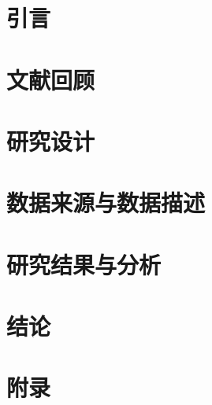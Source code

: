 \documentclass[lang=cn,a4paper]{elegantpaper}
\author{Zhengqing ZHOU \\ Peking University \and Zhengqing ZHOU \\ PA Technology}
\institute{\href{https://pe.pku.edu.cn/}{体育教研部}}
\date{\zhtoday}
\begin{document}
\begin{titlepage}
\clearpage\maketitle
\thispagestyle{empty}

\begin{abstract}
本文为 \href{https://github.com/ElegantLaTeX/ElegantPaper/}{ElegantPaper} 的说明文档。此模板基于 \LaTeX{} 的 article 类，专为工作论文写作而设计。设计这个模板的初衷是让作者不用关心工作论文的格式，专心写作，从而有更加舒心的写作体验。如果你有其他问题、建议或者报告 bug，可以在 \href{https://github.com/ElegantLaTeX/ElegantPaper/issues}{GitHub::ElegantPaper/issues} 留言。如果你想了解更多 Elegant\LaTeX{} 项目组设计的模板，请访问 \href{https://github.com/ElegantLaTeX/}{GitHub::ElegantLaTeX}。
\end{abstract}

\end{titlepage}


	\section{引言} \label{sec:introduction}
	
	\section{文献回顾} \label{sec:review}
	
	\section{研究设计} \label{sec:design}
	
    \section{数据来源与数据描述}\label{sec:data}
	
    \section{研究结果与分析}\label{sec:results}
	
	\section{结论} \label{sec:conclusion}
	
	\newpage
%	
%	
	\nocite{*}
	\printbibliography[heading=bibintoc, title=\ebibname]
	\newpage
	\appendix
	\section{附录} \label{sec:appendix}
	
	\addappheadtotoc
\end{document}
